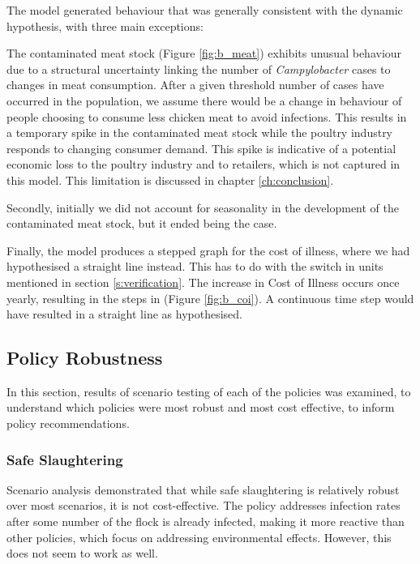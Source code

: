 The model generated behaviour that was generally consistent with the dynamic hypothesis, with three main exceptions:

The contaminated meat stock (Figure \ref{fig:b_meat}) exhibits unusual behaviour due to a structural uncertainty linking the number of \textit{Campylobacter} cases to changes in meat consumption. After a given threshold number of cases have occurred in the population, we assume there would be a change in behaviour of people choosing to consume less chicken meat to avoid infections. This results in a temporary spike in the contaminated meat stock while the poultry industry responds to changing consumer demand. This spike is indicative of a potential economic loss to the poultry industry and to retailers, which is not captured in this model. This limitation is discussed in chapter \ref{ch:conclusion}.

Secondly, initially we did not account for seasonality in the development of the contaminated meat stock, but it ended being the case. 

Finally, the model produces a stepped graph for the cost of illness, where we had hypothesised a straight line instead. This has to do with the switch in units mentioned in section \ref{s:verification}. The increase in Cost of Illness occurs once yearly, resulting in the steps in (Figure \ref{fig:b_coi}). A continuous time step would have resulted in a straight line as hypothesised. 

\subsection{Policy Robustness}
In this section, results of scenario testing of each of the policies was examined, to understand which policies were most robust and most cost effective, to inform policy recommendations.

\subsubsection{Safe Slaughtering}
\label{sec: safe slaughtering}
Scenario analysis demonstrated that while safe slaughtering is relatively robust over most scenarios, it is not cost-effective. The policy addresses infection rates after some number of the flock is already infected, making it more reactive than other policies, which focus on addressing environmental effects. However, this does not seem to work as well. 

